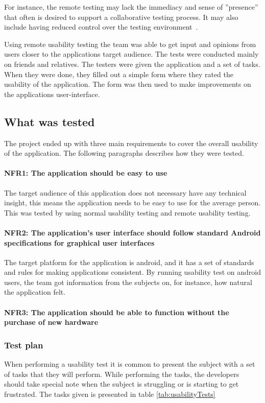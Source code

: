 For instance, the remote testing may lack the immediacy and sense of ''presence'' that often is desired to support a collaborative testing process. It may also include having reduced control over the testing environment~\cite{remoteTest}. 

Using remote usability testing the team was able to get input and opinions from users closer to the applications target audience.
The tests were conducted mainly on friends and relatives. The testers were given the application and a set of tasks. When they were done, they filled out a simple form where they rated the usability of the application. The form was then used to make improvements on the applications user-interface.

\subsection{What was tested}
The project ended up with three main requirements to cover the overall usability of the application. The following paragraphs describes how they were tested.

\paragraph{NFR1: The application should be easy to use}
The target audience of this application does not necessary have any technical insight, this means the application needs to be easy to use for the average person. This was tested by using normal usability testing and remote usability testing.

\paragraph{NFR2: The application's user interface should follow standard Android specifications for graphical user interfaces}
The target platform for the application is android, and it has a set of standards and rules for making applications consistent.
By running usability test on android users, the team got information from the subjects on, for instance, how natural the application felt.

\paragraph{NFR3: The application should be able to function without the purchase of new hardware}


\subsubsection{Test plan}
When performing a usability test it is common to present the subject with a set of tasks that they will perform. While performing the tasks, the developers should take special note when the subject is struggling or is starting to get frustrated. The tasks given is presented in table \ref{tab:usabilityTests}


